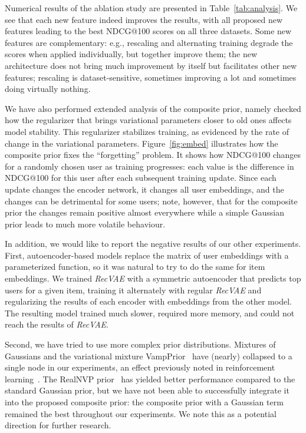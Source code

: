 \documentclass[sigconf,authorversion]{acmart}
\begin{document}
Numerical results of the ablation study are presented in Table~\ref{tab:analysis}. We see that each new feature indeed improves the results, with all proposed new features leading to the best NDCG@100 scores on all three datasets. Some new features are complementary: e.g.,  rescaling and alternating training degrade the scores when applied individually, but together improve them; the new architecture does not bring much improvement by itself but facilitates other new features;  rescaling is dataset-sensitive, sometimes improving a lot and sometimes doing virtually nothing.

We have also performed extended analysis of the composite prior, namely checked how the  regularizer that brings variational parameters closer to old ones affects model stability. This regularizer stabilizes training, as evidenced by the rate of change in the variational parameters.
Figure~\ref{fig:embed} illustrates how the composite prior fixes the ``forgetting'' problem. It shows how NDCG@100 changes for a randomly chosen user as training progresses: each value is the difference in NDCG@100 for this user after each subsequent training update. Since each update changes the encoder network, it changes all user embeddings, and the changes can be detrimental for some users; note, however, that for the composite prior the changes remain positive almost everywhere while a simple Gaussian prior leads to much more volatile behaviour.

In addition, we would like to report the negative results of our other experiments. First, autoencoder-based models replace the matrix of user embeddings with a parameterized function, so it was natural to try to do the same for item embeddings. We trained \emph{RecVAE} with a symmetric autoencoder that predicts top users for a given item, training it alternately with regular \emph{RecVAE} and regularizing the results of each encoder with embeddings from the other model. The resulting model trained much slower, required more memory, and could not reach the results of \emph{RecVAE}.

Second, we have tried to use more complex prior distributions. Mixtures of Gaussians and the variational mixture VampPrior~\cite{tomczak2018vae} have (nearly) collapsed to a single node in our experiments, an effect previously noted in reinforcement learning~\cite{DBLP:journals/corr/abs-1809-10326}. The RealNVP prior~\cite{DBLP:conf/iclr/DinhSB17} has yielded better performance compared to the standard Gaussian prior, but we have not been able to successfully integrate it into the proposed composite prior: the composite prior with a Gaussian term remained the best throughout our experiments. We note this as a potential direction for further research.
\end{document}
